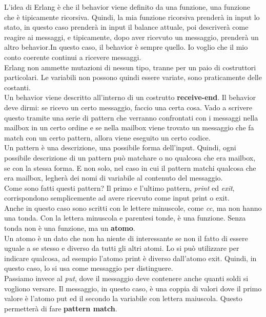 \documentclass{article}
\begin{document}
L'idea di Erlang è che il behavior viene definito da una funzione, una funzione che è tipicamente ricorsiva. Quindi, la mia funzione ricorsiva prenderà in input lo stato, in questo caso prenderà in input il balance attuale, poi descriverà come reagire ai messaggi, e tipicamente, dopo aver ricevuto un messaggio, prenderà un altro behavior.In questo caso, il behavior è sempre quello. Io voglio che il mio conto coerente continui a ricevere messaggi.\vspace{14pt}\\
Erlang non ammette mutazioni di nessun tipo, tranne per un paio di costruttori particolari. Le variabili non possono quindi essere variate, sono praticamente delle costanti.\vspace{14pt}\\
Un behavior viene descritto all'interno di un costrutto \textbf{receive-end}.
Il behavior deve dirmi: se ricevo un certo messaggio, faccio una certa cosa. Vado a scrivere questo tramite una serie di pattern che verranno confrontati con i messaggi nella mailbox in un certo ordine e se nella mailbox viene trovato un messaggio che fa match con un certo pattern, allora viene eseguito un certo codice.\\
Un pattern è una descrizione, una possibile forma dell'input. Quindi, ogni possibile descrizione di un pattern può matchare o no qualcosa che era mailbox, se con la stessa forma. E non solo, nel caso in cui il pattern matchi qualcosa che era mailbox, legherà dei nomi di variabile al contenuto del messaggio.\vspace{14pt}\\
Come sono fatti questi pattern? Il primo e l'ultimo pattern, \textit{print} ed \textit{exit}, corrispondono semplicemente ad avere ricevuto come input print o exit.\\
Anche in questo caso sono scritti con le lettere minuscole, come \textit{cc}, ma non hanno una tonda.
Con la lettera minuscola e parentesi tonde, è una funzione. Senza tonda non è una funzione, ma un \textbf{atomo}.\\
Un atomo è un dato che non ha niente di interessante se non il fatto di essere uguale a se stesso e diverso da tutti gli altri atomi. Lo si può utilizzare per indicare qualcosa, ad esempio l'atomo print è diverso dall'atomo exit. Quindi, in questo caso, lo si usa come messaggio per distinguere.\vspace{14pt}\\
Passiamo invece al \textit{put}, dove il messaggio deve contenere anche quanti soldi si vogliono versare. Il messaggio, in questo caso, è una coppia di valori dove il primo valore è l'atomo put ed il secondo la variabile con lettera maiuscola. Questo permetterà di fare \textbf{pattern match}.\\
\end{document}
